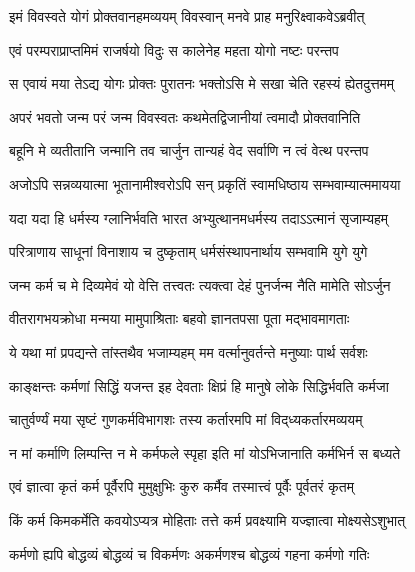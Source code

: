 \twolineshloka
{इमं विवस्वते योगं प्रोक्तवानहमव्ययम्}
{विवस्वान् मनवे प्राह मनुरिक्ष्वाकवेऽब्रवीत्}%

\twolineshloka
{एवं परम्पराप्राप्तमिमं राजर्षयो विदुः}
{स कालेनेह महता योगो नष्टः परन्तप}%

\twolineshloka
{स एवायं मया तेऽद्य योगः प्रोक्तः पुरातनः}
{भक्तोऽसि मे सखा चेति रहस्यं ह्येतदुत्तमम्}%

\twolineshloka
{अपरं भवतो जन्म परं जन्म विवस्वतः}
{कथमेतद्विजानीयां त्वमादौ प्रोक्तवानिति}%

\twolineshloka
{बहूनि मे व्यतीतानि जन्मानि तव चार्जुन}
{तान्यहं वेद सर्वाणि न त्वं वेत्थ परन्तप}%

\twolineshloka
{अजोऽपि सन्नव्ययात्मा भूतानामीश्वरोऽपि सन्}
{प्रकृतिं स्वामधिष्ठाय सम्भवाम्यात्ममायया}%

\twolineshloka
{यदा यदा हि धर्मस्य ग्लानिर्भवति भारत}
{अभ्युत्थानमधर्मस्य तदाऽऽत्मानं सृजाम्यहम्}%

\twolineshloka
{परित्राणाय साधूनां विनाशाय च दुष्कृताम्}
{धर्मसंस्थापनार्थाय सम्भवामि युगे युगे}%

\twolineshloka
{जन्म कर्म च मे दिव्यमेवं यो वेत्ति तत्त्वतः}
{त्यक्त्वा देहं पुनर्जन्म नैति मामेति सोऽर्जुन}%

\twolineshloka
{वीतरागभयक्रोधा मन्मया मामुपाश्रिताः}
{बहवो ज्ञानतपसा पूता मद्भावमागताः}%

\twolineshloka
{ये यथा मां प्रपद्यन्ते तांस्तथैव भजाम्यहम्}
{मम वर्त्मानुवर्तन्ते मनुष्याः पार्थ सर्वशः}%

\twolineshloka
{काङ्क्षन्तः कर्मणां सिद्धिं यजन्त इह देवताः}
{क्षिप्रं हि मानुषे लोके सिद्धिर्भवति कर्मजा}%

\twolineshloka
{चातुर्वर्ण्यं मया सृष्टं गुणकर्मविभागशः}
{तस्य कर्तारमपि मां विद्‌ध्यकर्तारमव्ययम्}%

\twolineshloka
{न मां कर्माणि लिम्पन्ति न मे कर्मफले स्पृहा}
{इति मां योऽभिजानाति कर्मभिर्न स बध्यते}%

\twolineshloka
{एवं ज्ञात्वा कृतं कर्म पूर्वैरपि मुमुक्षुभिः}
{कुरु कर्मैव तस्मात्त्वं पूर्वैः पूर्वतरं कृतम्}%

\twolineshloka
{किं कर्म किमकर्मेति कवयोऽप्यत्र मोहिताः}
{तत्ते कर्म प्रवक्ष्यामि यज्ज्ञात्वा मोक्ष्यसेऽशुभात्}%

\twolineshloka
{कर्मणो ह्यपि बोद्धव्यं बोद्धव्यं च विकर्मणः}
{अकर्मणश्च बोद्धव्यं गहना कर्मणो गतिः}%

